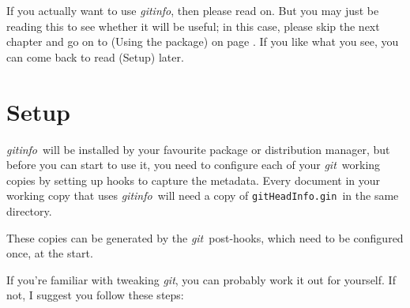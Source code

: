 \documentclass[a4paper,12pt,twoside,openany]{memoir}
\newcommand{\sfit}[1]{\textit{#1}}
\newcommand{\git}{\sfit{git}}
\newcommand{\tpname}{\sfit{gitinfo}}
\newcommand{\ginname}{gitHeadInfo.gin}
\newcommand{\metaname}{\texttt{\ginname}}
\begin{document}
If you actually want to use \tpname, then please read on.
But you may just be reading this to see whether it will be useful;
in this case,
please skip the next chapter and go on to (Using the package)
on page \pageref{ch:using}.
If you like what you see, you can come back to
read (Setup) later. 
\chapter{Setup}
\tpname\ will be installed by your favourite package or distribution manager,
but before you can start to use it,
you need to configure each of your \git\ working copies
by setting up hooks to capture the metadata.
Every document in your working copy that uses \tpname\
will need a copy of \metaname\ in the same directory.

These copies can be generated by the \git\ post-hooks,
which need to be configured once, at the start.

If you're familiar with tweaking \git, you can probably work it out for yourself.
If not, I suggest you follow these steps:
\end{document}
